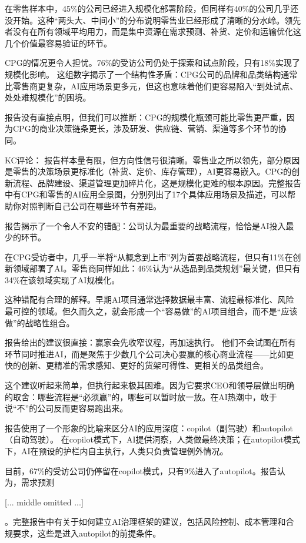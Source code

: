 \documentclass[11pt]{ctexart}
\begin{document}
在零售样本中，45\%的公司已经进入规模化部署阶段，但同样有40\%的公司几乎还没开始。这种“两头大、中间小”的分布说明零售业已经形成了清晰的分水岭。领先者没有在所有领域平均用力，而是集中资源在需求预测、补货、定价和运输优化这几个价值最容易验证的环节。

CPG的情况更令人担忧。76\%的受访公司仍处于探索和试点阶段，只有18\%实现了规模化影响。 这组数字揭示了一个结构性矛盾：CPG公司的品牌和品类结构通常比零售商更复杂，AI应用场景更多元，但这也意味着他们更容易陷入“到处试点、处处难规模化”的困境。

报告没有直接点明，但我们可以推断：CPG的规模化瓶颈可能比零售更严重，因为CPG的商业决策链条更长，涉及研发、供应链、营销、渠道等多个环节的协同。

KC评论： 报告样本量有限，但方向性信号很清晰。零售业之所以领先，部分原因是零售的决策场景更标准化（补货、定价、库存管理），AI更容易嵌入。CPG的创新流程、品牌建设、渠道管理更加碎片化，这是规模化更难的根本原因。完整报告中有CPG和零售的AI应用全景图，分别列出了17个具体应用场景及描述，可以帮助你对照判断自己公司在哪些环节有差距。

报告揭示了一个令人不安的错配：公司认为最重要的战略流程，恰恰是AI投入最少的环节。

在CPG受访者中，几乎一半将“从概念到上市”列为首要战略流程，但只有11\%在创新领域部署了AI。零售商同样如此：46\%认为“从选品到品类规划”最关键，但只有34\%在该领域实现了AI规模化。

这种错配有合理的解释。早期AI项目通常选择数据最丰富、流程最标准化、风险最可控的领域。但久而久之，就会形成一个“容易做”的AI项目组合，而不是“应该做”的战略性组合。

报告给出的建议很直接：赢家会先收窄议程，再加速执行。 他们不会试图在所有环节同时推进AI，而是聚焦于少数几个公司决心要赢的核心商业流程——比如更快的创新、更精准的需求感知、更好的货架可得性、更相关的品类组合。

这个建议听起来简单，但执行起来极其困难。因为它要求CEO和领导层做出明确的取舍：哪些流程是“必须赢”的，哪些可以暂时放一放。在AI热潮中，敢于说“不”的公司反而更容易跑出来。

报告使用了一个形象的比喻来区分AI的应用深度：copilot（副驾驶）和autopilot（自动驾驶）。 在copilot模式下，AI提供洞察，人类做最终决策；在autopilot模式下，AI在预设的护栏内自主执行，人类只负责管理例外情况。

目前，67\%的受访公司仍停留在copilot模式，只有9\%进入了autopilot。报告认为，需求预测

[... middle omitted ...]

。完整报告中有关于如何建立AI治理框架的建议，包括风险控制、成本管理和合规要求，这些是进入autopilot的前提条件。
\end{document}
